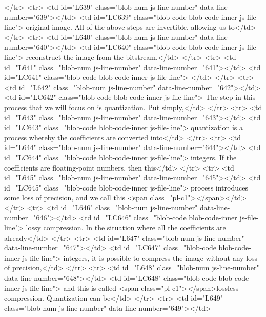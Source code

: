       </tr>
      <tr>
        <td id="L639" class="blob-num js-line-number" data-line-number="639"></td>
        <td id="LC639" class="blob-code blob-code-inner js-file-line"> original image. All of the above steps are invertible, allowing us to</td>
      </tr>
      <tr>
        <td id="L640" class="blob-num js-line-number" data-line-number="640"></td>
        <td id="LC640" class="blob-code blob-code-inner js-file-line"> reconstruct the image from the bitstream.</td>
      </tr>
      <tr>
        <td id="L641" class="blob-num js-line-number" data-line-number="641"></td>
        <td id="LC641" class="blob-code blob-code-inner js-file-line">
</td>
      </tr>
      <tr>
        <td id="L642" class="blob-num js-line-number" data-line-number="642"></td>
        <td id="LC642" class="blob-code blob-code-inner js-file-line"> The step in this process that we will focus on is quantization. Put simply,</td>
      </tr>
      <tr>
        <td id="L643" class="blob-num js-line-number" data-line-number="643"></td>
        <td id="LC643" class="blob-code blob-code-inner js-file-line"> quantization is a process whereby the coefficients are converted into</td>
      </tr>
      <tr>
        <td id="L644" class="blob-num js-line-number" data-line-number="644"></td>
        <td id="LC644" class="blob-code blob-code-inner js-file-line"> integers. If the coefficients are floating-point numbers, then this</td>
      </tr>
      <tr>
        <td id="L645" class="blob-num js-line-number" data-line-number="645"></td>
        <td id="LC645" class="blob-code blob-code-inner js-file-line"> process introduces some loss of precision, and we call this <span class="pl-c1">\textit</span>{</td>
      </tr>
      <tr>
        <td id="L646" class="blob-num js-line-number" data-line-number="646"></td>
        <td id="LC646" class="blob-code blob-code-inner js-file-line"> lossy compression}. In the situation where all the coefficients are already</td>
      </tr>
      <tr>
        <td id="L647" class="blob-num js-line-number" data-line-number="647"></td>
        <td id="LC647" class="blob-code blob-code-inner js-file-line"> integers, it is possible to compress the image without any loss of precision,</td>
      </tr>
      <tr>
        <td id="L648" class="blob-num js-line-number" data-line-number="648"></td>
        <td id="LC648" class="blob-code blob-code-inner js-file-line"> and this is called <span class="pl-c1">\textit</span>{lossless compression}. Quantization can be</td>
      </tr>
      <tr>
        <td id="L649" class="blob-num js-line-number" data-line-number="649"></td>

